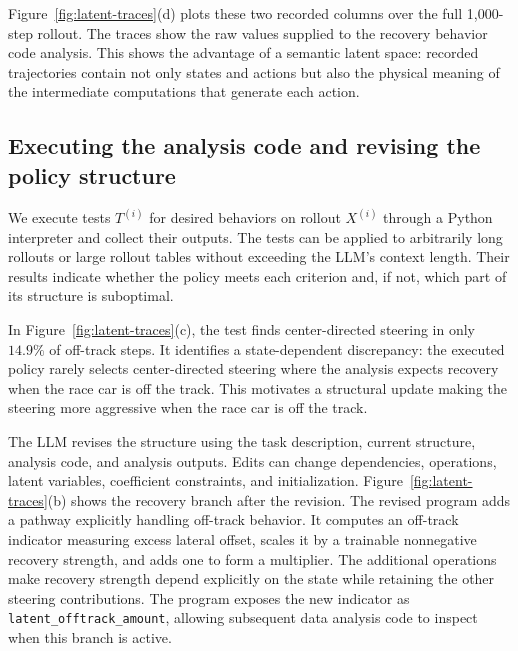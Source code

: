 Figure~\ref{fig:latent-traces}(d) plots these two recorded columns over the full 1,000-step rollout.
The traces show the raw values supplied to the recovery behavior code analysis.
This shows the advantage of a semantic latent space: recorded trajectories contain not only states and actions but also the physical meaning of the intermediate computations that generate each action.

\subsection{Executing the analysis code and revising the policy structure}
\label{sec:revision}

We execute tests $T^{(i)}$ for desired behaviors on rollout $X^{(i)}$ through a Python interpreter and collect their outputs.
The tests can be applied to arbitrarily long rollouts or large rollout tables without exceeding the LLM's context length. Their results indicate whether the policy meets each criterion and, if not, which part of its structure is suboptimal.

In Figure~\ref{fig:latent-traces}(c), the test finds center-directed steering in only $14.9\%$ of off-track steps.
It identifies a state-dependent discrepancy: the executed policy rarely selects center-directed steering where the analysis expects recovery when the race car is off the track. This motivates a structural update making the steering more aggressive when the race car is off the track.

The LLM revises the structure using the task description, current structure, analysis code, and analysis outputs.
Edits can change dependencies, operations, latent variables, coefficient constraints, and initialization.
Figure~\ref{fig:latent-traces}(b) shows the recovery branch after the revision.
The revised program adds a pathway explicitly handling off-track behavior.
It computes an off-track indicator measuring excess lateral offset, scales it by a trainable nonnegative recovery strength, and adds one to form a multiplier.
The additional operations make recovery strength depend explicitly on the state while retaining the other steering contributions.
The program exposes the new indicator as \texttt{latent\_offtrack\_amount}, allowing subsequent data analysis code to inspect when this branch is active.

